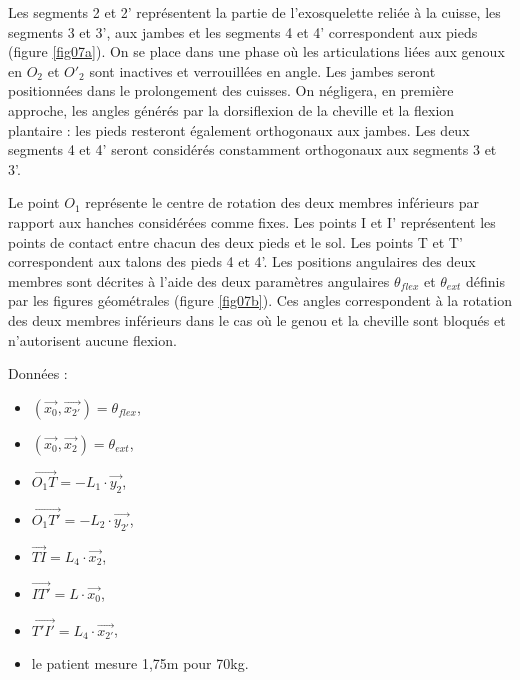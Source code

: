 Les segments 2 et 2' représentent la partie de l'exosquelette reliée à la cuisse, les segments 3 et 3', aux jambes et les segments 4 et 4' correspondent aux pieds (figure \ref{fig07a}). On se place dans une phase où les articulations liées aux genoux en $O_2$ et $O'_2$ sont inactives et verrouillées en angle. Les
jambes seront positionnées dans le prolongement des cuisses. On négligera, en première approche, les angles générés par la dorsiflexion de la cheville et la flexion plantaire : les pieds resteront également orthogonaux aux jambes. Les deux segments 4 et 4' seront considérés constamment orthogonaux aux segments 3 et 3'.

Le point $O_1$ représente le centre de rotation des deux membres inférieurs par rapport aux hanches considérées comme fixes. Les points I et I' représentent les points de contact entre chacun des deux pieds et le sol. Les points T et T' correspondent aux talons des pieds 4 et 4'. Les positions angulaires
des deux membres sont décrites à l'aide des deux paramètres angulaires $\theta_{flex}$ et $\theta_{ext}$ définis par les figures géométrales (figure \ref{fig07b}). Ces angles correspondent à la rotation des deux membres inférieurs dans le cas où le genou et la cheville sont bloqués et n'autorisent aucune flexion.  

\newpage

Données :\\
\begin{minipage}{0.45\linewidth}
\begin{itemize}
 \item $\left(\vec{x_0},\vec{x_{2'}}\right)=\theta_{flex}$,
 \item $\left(\vec{x_0},\vec{x_2}\right)=\theta_{ext}$,
 \item $\overrightarrow{O_1T}=-L_1\cdot\vec{y_2}$,
 \item $\overrightarrow{O_1T'}=-L_2\cdot\vec{y_{2'}}$,
\end{itemize}
\end{minipage}\hfill
\begin{minipage}{0.45\linewidth}
\begin{itemize}
 \item $\overrightarrow{TI}=L_4\cdot\vec{x_2}$,
 \item $\overrightarrow{IT'}=L\cdot\vec{x_0}$,
 \item $\overrightarrow{T'I'}=L_4\cdot\vec{x_{2'}}$,
 \item le patient mesure 1,75m pour 70kg.
\end{itemize}
\end{minipage}

